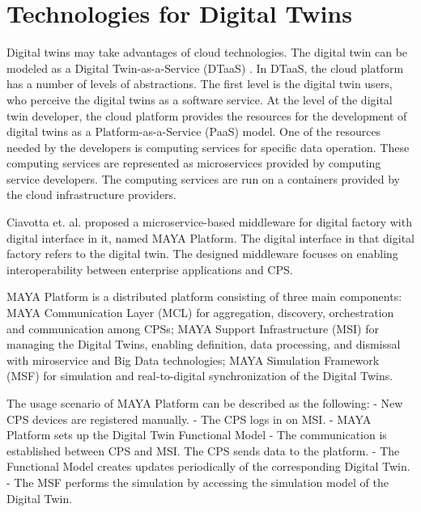 \documentclass[article]{aaltoseries}
\begin{document}





\section{Technologies for Digital Twins}
Digital twins may take advantages of cloud technologies. The digital twin can be modeled as a Digital Twin-as-a-Service (DTaaS) \cite{borodulin2017towards}. In DTaaS, the cloud platform has a number of levels of abstractions. The first level is the digital twin users, who perceive the digital twins as a software service. At the level of the digital twin developer, the cloud platform provides the resources for the development of digital twins as a Platform-as-a-Service (PaaS) model. One of the resources needed by the developers is computing services for specific data operation. These computing services are represented as microservices provided by computing service developers. The computing services are run on a containers provided by the cloud infrastructure providers.

Ciavotta et. al. \cite{ciavotta2017microservice} proposed a microservice-based middleware for digital factory with digital interface in it, named MAYA Platform. The digital interface in that digital factory refers to the digital twin. The designed middleware focuses on enabling interoperability between enterprise applications and CPS.

MAYA Platform is a distributed platform consisting of three main components: MAYA Communication Layer (MCL) for aggregation, discovery, orchestration and communication among CPSs; MAYA Support Infrastructure (MSI) for managing the Digital Twins, enabling definition, data processing, and dismissal with miroservice and Big Data technologies; MAYA Simulation Framework (MSF) for simulation and real-to-digital synchronization of the Digital Twins.

The usage scenario of MAYA Platform can be described as the following:
- New CPS devices are registered manually.
- The CPS logs in on MSI.
- MAYA Platform sets up the Digital Twin Functional Model
- The communication is established between CPS and MSI. The CPS sends data to the platform.
- The Functional Model creates updates periodically of the corresponding Digital Twin.
- The MSF performs the simulation by accessing the simulation model of the Digital Twin.
\end{document}
